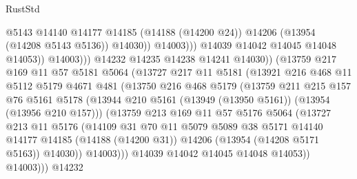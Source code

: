 \begin{lexlean}{RustStd}
\begin{coremodule}
                                    @5143
                                    @14140
                                    @14177
                                    @14185
                                    (@14188 (@14200 @24))
                                    @14206
                                    (@13954 (@14208 @5143 @5136))
                                    @14030))
                                @14003)))
                          @14039
                          @14042
                          @14045
                          @14048
                          @14053))
                      @14003)))
                @14232
                @14235
                @14238
                @14241
                @14030))
            (@13759
              @217
              @169
              @11
              @57
              @5181
              @5064
              (@13727
                @217
                @11
                @5181
                (@13921
                  @216
                  @468
                  @11
                  @5112
                  @5179
                  @4671
                  @481
                  (@13750
                    @216
                    @468
                    @5179
                    (@13759
                      @211
                      @215
                      @157
                      @76
                      @5161
                      @5178
                      (@13944 @210 @5161 (@13949 (@13950 @5161)) (@13954 (@13956 @210 @157)))
                      (@13759
                        @213
                        @169
                        @11
                        @57
                        @5176
                        @5064
                        (@13727
                          @213
                          @11
                          @5176
                          (@14109
                            @31
                            @70
                            @11
                            @5079
                            @5089
                            @38
                            @5171
                            @14140
                            @14177
                            @14185
                            (@14188 (@14200 @31))
                            @14206
                            (@13954 (@14208 @5171 @5163))
                            @14030))
                        @14003)))
                  @14039
                  @14042
                  @14045
                  @14048
                  @14053))
              @14003)))
        @14232

\end{coremodule}
\end{lexlean}
